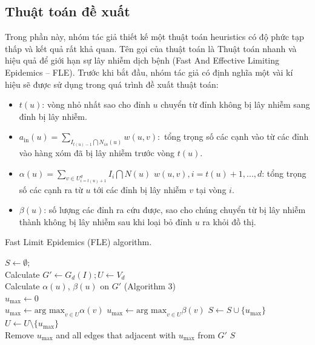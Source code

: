 \subsection{Thuật toán đề xuất}
Trong phần này, nhóm tác giả thiết kế một thuật toán heuristics có độ phức tạp thấp và kết quả rất khả quan. Tên gọi của thuật toán là Thuật toán nhanh và hiệu quả để giới hạn sự lây nhiễm dịch bệnh (Fast And Effective Limiting Epidemics – FLE). 
Trước khi bắt đầu, nhóm tác giả có định nghĩa một vài kí hiệu sẽ được sử dụng trong quá trình đề xuất thuật toán:
\begin {itemize}
\item $t(u)$: vòng nhỏ nhất sao cho đỉnh $u$ chuyển từ đỉnh không bị lây nhiễm sang đỉnh bị lây nhiễm.

\item $a_{\text{in}}(u) = \sum_{I_{t(u) - 1} \bigcap N_{in}(u)} w(u,v):$ tổng trọng số các cạnh vào từ các đỉnh vào hàng xóm đã bị lây nhiễm trước vòng $t(u)$.

\item $\alpha(u) = \sum_{v \in U^{d}_{i=t(u)+1}} I_{i} \bigcap N(u)$ $w(u,v), i = t(u) + 1, ... , d$: tổng trọng số các cạnh ra từ $u$ tới các đỉnh bị lây nhiễm $v$ tại vòng $i$.

\item $\beta(u)$: số lượng các đỉnh ra cứu được, sao cho chúng chuyển từ bị lây nhiễm thành không bị lây nhiễm sau khi loại bỏ đỉnh $u$ ra khỏi đồ thị.
\end {itemize}
\begin{algorithm}[H]
	\caption{Fast Limit Epidemics (FLE) algorithm.}
	\label{alg:Algo1}
	$S \gets \emptyset$; 
	\\
	Calculate $G' \gets G_{d}(I); U \gets V_{d}$
	\\
	{
		Calculate $\alpha(u)$, $\beta(u)$ on $G'$ (Algorithm 3)
		\\
		$u_{\text{max}} \gets 0$
		\\
		{
			$u_{\text{max}} \gets \text{arg max}_{v \in U}\alpha(v)$
		}
		{
			$u_{\text{max}} \gets \text{arg max}_{v \in U}\beta(v)$
		}
		$S \gets S \cup \{u_{\text{max}}\}$
		\\
		$U \gets U \setminus \{u_{\text{max}}\}$
		\\
		Remove $u_{\text{max}}$ and all edges that adjacent with $u_{\text{max}}$ from $G'$
	}
	\Return $S$
\end{algorithm}

